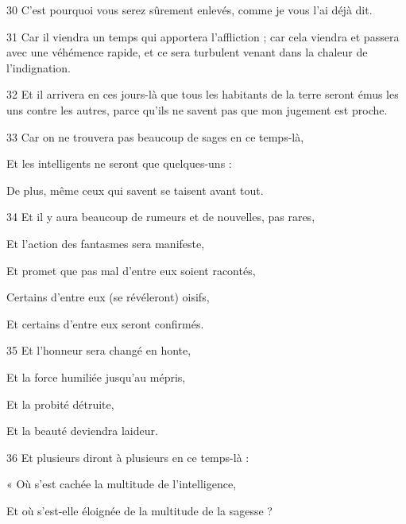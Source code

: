 \par 30 C'est pourquoi vous serez sûrement enlevés, comme je vous l'ai déjà dit.

\par 31 Car il viendra un temps qui apportera l'affliction ; car cela viendra et passera avec une véhémence rapide, et ce sera turbulent venant dans la chaleur de l'indignation.

\par 32 Et il arrivera en ces jours-là que tous les habitants de la terre seront émus les uns contre les autres, parce qu'ils ne savent pas que mon jugement est proche.

\par 33 Car on ne trouvera pas beaucoup de sages en ce temps-là,

\par Et les intelligents ne seront que quelques-uns :

\par De plus, même ceux qui savent se taisent avant tout.

\par 34 Et il y aura beaucoup de rumeurs et de nouvelles, pas rares,

\par Et l'action des fantasmes sera manifeste,

\par Et promet que pas mal d'entre eux soient racontés,

\par Certains d'entre eux (se révéleront) oisifs,

\par Et certains d'entre eux seront confirmés.

\par 35 Et l'honneur sera changé en honte,

\par Et la force humiliée jusqu'au mépris,

\par Et la probité détruite,

\par Et la beauté deviendra laideur.

\par 36 Et plusieurs diront à plusieurs en ce temps-là :

\par « Où s'est cachée la multitude de l'intelligence,

\par Et où s’est-elle éloignée de la multitude de la sagesse ?

